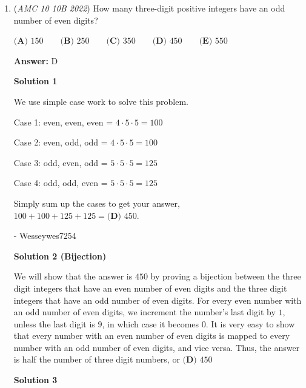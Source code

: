 \begin{enumerate}
 \textbf{Answer: }D



\textbf{Solution}

Notice that $BC = AD = AP + PD = 3 + 2 = 5$.Now, because the question tells us $ABCD$ is a rhombus, $BC = AB = 5$. Thus, by Pythagorean Theorem on $APB$, $BP = 4$.Therefore, 
 \[[ABCD] = AD \times BP = 5 \times 4 = \boxed{\text{D 20}}\]~DUODUOLUO(First time using $\LaTeX$, may have some minor mistakes)

 


	\item (\textit{AMC 10 10B 2022}) How many three-digit positive integers have an odd number of even digits?


 $\textbf{(A) }150\qquad\textbf{(B) }250\qquad\textbf{(C) }350\qquad\textbf{(D) }450\qquad\textbf{(E) }550$

 \textbf{Answer: }D



\textbf{Solution 1}

We use simple case work to solve this problem.

 Case 1: even, even, even = $4 \cdot 5 \cdot 5 = 100$

 Case 2: even, odd, odd = $4 \cdot 5 \cdot 5 = 100$

 Case 3: odd, even, odd = $5 \cdot 5 \cdot 5 = 125$

 Case 4: odd, odd, even = $5 \cdot 5 \cdot 5 = 125$

 Simply sum up the cases to get your answer, $100 + 100 + 125 + 125 = \boxed{\textbf{(D)~}450}$.

 - Wesseywes7254

 



\textbf{Solution 2 (Bijection)}

We will show that the answer is $450$ by proving a bijection between the three digit integers that have an even number of even digits and the three digit integers that have an odd number of even digits. For every even number with an odd number of even digits, we increment the number's last digit by $1$, unless the last digit is $9$, in which case it becomes $0$. It is very easy to show that every number with an even number of even digits is mapped to every number with an odd number of even digits, and vice versa. Thus, the answer is half the number of three digit numbers, or $\boxed{\textbf{(D)~}450}$




\textbf{Solution 3}


\end{enumerate}

